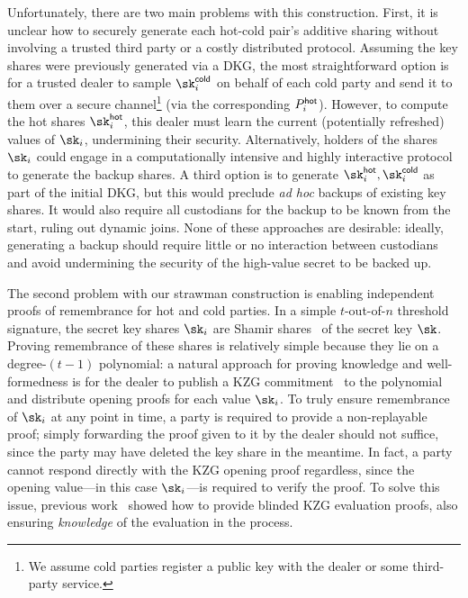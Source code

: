 Unfortunately, there are two main problems with this construction. First, it is unclear how to securely generate each hot-cold pair's additive sharing without involving a trusted third party or a costly distributed protocol. Assuming the key shares were previously generated via a DKG, the most straightforward option is for a trusted dealer to sample $\sk_i^\cold$ on behalf of each cold party and send it to them over a secure channel\footnote{We assume cold parties register a public key with the dealer or some third-party service.} (via the corresponding $P_i^{\mathsf{hot}}$). However, to compute the hot shares $\sk_i^\hot$, this dealer must learn the current (potentially refreshed) values of $\sk_i$, undermining their security. Alternatively, holders of the shares $\sk_i$ could engage in a computationally intensive and highly interactive protocol to generate the backup shares. A third option is to generate $\sk_i^\hot, \sk_i^\cold$ as part of the initial DKG, but this would preclude \textit{ad hoc} backups of existing key shares. It would also require all custodians for the backup to be known from the start, ruling out dynamic joins. %
None of these approaches are desirable: ideally, generating a backup should require little or no interaction between custodians and avoid undermining the security of the high-value secret to be backed up.

The second problem with our strawman construction is enabling independent proofs of remembrance for hot and cold parties. In a simple $t$-out-of-$n$ threshold signature, the secret key shares $\sk_i$ are Shamir shares~\cite{CACM:Shamir79} of the secret key $\sk$. Proving remembrance of these shares is relatively simple because they lie on a degree-$(t-1)$ polynomial: a natural approach for proving knowledge and well-formedness is for the dealer to publish a KZG commitment~\cite{AC:KatZavGol10} to the polynomial and distribute opening proofs for each value $\sk_i$. To truly ensure remembrance of $\sk_i$ at any point in time, a party is required to provide a non-replayable proof; simply forwarding the proof given to it by the dealer should not suffice, since the party may have deleted the key share in the meantime. In fact, a party cannot respond directly with the KZG opening proof regardless, since the opening value---in this case $\sk_i$---is required to verify the proof. To solve this issue, previous work~\cite{CCS:ZBKMNS22} showed how to provide blinded KZG evaluation proofs, also ensuring \emph{knowledge} of the evaluation in the process.

